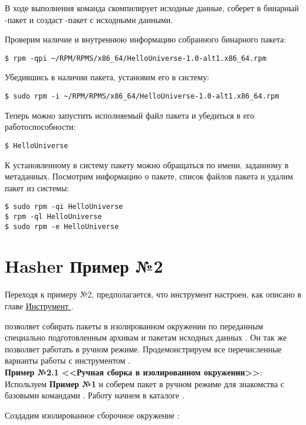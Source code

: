 В ходе выполнения команда скомпилирует исходные данные, соберет
в бинарный -пакет и создаст -пакет с исходными данными.

Проверим наличие и внутреннюю информацию собранного бинарного пакета:
\begin{verbatim}
$ rpm -qpi ~/RPM/RPMS/x86_64/HelloUniverse-1.0-alt1.x86_64.rpm
\end{verbatim}

Убедившись в наличии пакета, установим его в систему:
\begin{verbatim}
$ sudo rpm -i ~/RPM/RPMS/x86_64/HelloUniverse-1.0-alt1.x86_64.rpm
\end{verbatim}

Теперь можно запустить исполняемый файл пакета и убедиться в его
работоспособности:
\begin{verbatim}
$ HelloUniverse
\end{verbatim}

К установленному в систему пакету можно обращаться по имени, заданному в
метаданных. Посмотрим информацию о пакете, список файлов пакета и удалим
пакет из системы:
\begin{verbatim}
$ sudo rpm -qi HelloUniverse
$ rpm -ql HelloUniverse
$ sudo rpm -e HelloUniverse
\end{verbatim}

\section{Hasher \textbf{Пример №2}}

Переходя к примеру №2, предполагается, что инструмент  настроен,
как описано в главе \hyperlink{5}{Инструмент }.

 позволяет собирать пакеты в изолированном окружении по
переданным специально подготовленным архивам  и пакетам
исходных данных . Он так же позволяет работать в ручном
режиме. Продемонстрируем все перечисленные варианты работы с
инструментом .\\

\textbf{Пример №2.1 <<Ручная сборка в изолированном окружении>>}:\\

Используем \textbf{Пример №1} и соберем пакет  в ручном режиме
для знакомства с базовыми командами . Работу начнем в
каталоге .

Создадим изолированное сборочное окружение :

